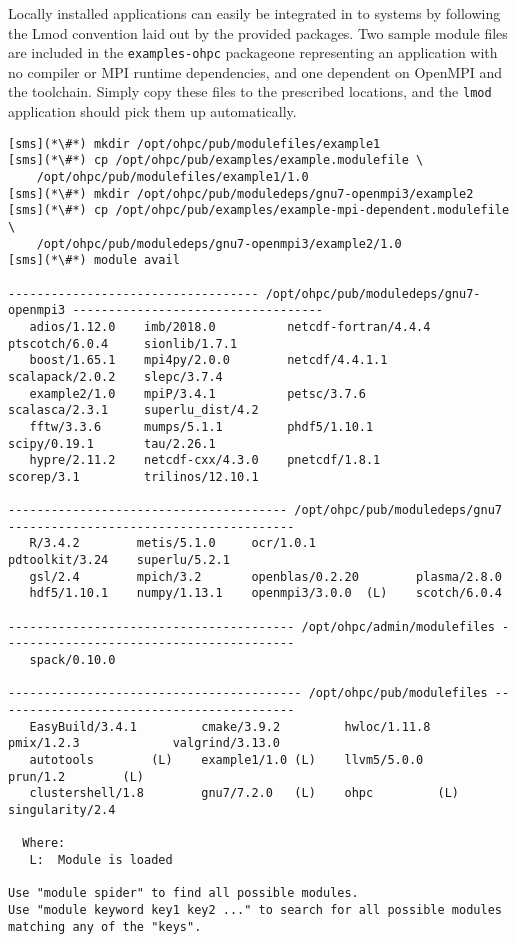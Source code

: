 Locally installed applications can easily be integrated in to \OHPC{} systems by
following the Lmod convention laid out by the provided packages. Two sample
module files are included in the \texttt{examples-ohpc} package\textemdash one
representing an application with no compiler or MPI runtime dependencies, and
one dependent on OpenMPI and the \GNU{} toolchain. Simply copy these files to the
prescribed locations, and the \texttt{lmod} application should pick them up
automatically.

\begin{lstlisting}[alsoletter={/,.},morekeywords={example1/1.0, example2/1.0}]
[sms](*\#*) mkdir /opt/ohpc/pub/modulefiles/example1
[sms](*\#*) cp /opt/ohpc/pub/examples/example.modulefile \
    /opt/ohpc/pub/modulefiles/example1/1.0
[sms](*\#*) mkdir /opt/ohpc/pub/moduledeps/gnu7-openmpi3/example2
[sms](*\#*) cp /opt/ohpc/pub/examples/example-mpi-dependent.modulefile \
    /opt/ohpc/pub/moduledeps/gnu7-openmpi3/example2/1.0
[sms](*\#*) module avail

----------------------------------- /opt/ohpc/pub/moduledeps/gnu7-openmpi3 -----------------------------------
   adios/1.12.0    imb/2018.0          netcdf-fortran/4.4.4    ptscotch/6.0.4     sionlib/1.7.1
   boost/1.65.1    mpi4py/2.0.0        netcdf/4.4.1.1          scalapack/2.0.2    slepc/3.7.4
   example2/1.0    mpiP/3.4.1          petsc/3.7.6             scalasca/2.3.1     superlu_dist/4.2
   fftw/3.3.6      mumps/5.1.1         phdf5/1.10.1            scipy/0.19.1       tau/2.26.1
   hypre/2.11.2    netcdf-cxx/4.3.0    pnetcdf/1.8.1           scorep/3.1         trilinos/12.10.1

--------------------------------------- /opt/ohpc/pub/moduledeps/gnu7 ----------------------------------------
   R/3.4.2        metis/5.1.0     ocr/1.0.1              pdtoolkit/3.24    superlu/5.2.1
   gsl/2.4        mpich/3.2       openblas/0.2.20        plasma/2.8.0
   hdf5/1.10.1    numpy/1.13.1    openmpi3/3.0.0  (L)    scotch/6.0.4

---------------------------------------- /opt/ohpc/admin/modulefiles -----------------------------------------
   spack/0.10.0

----------------------------------------- /opt/ohpc/pub/modulefiles ------------------------------------------
   EasyBuild/3.4.1         cmake/3.9.2         hwloc/1.11.8        pmix/1.2.3             valgrind/3.13.0
   autotools        (L)    example1/1.0 (L)    llvm5/5.0.0         prun/1.2        (L)
   clustershell/1.8        gnu7/7.2.0   (L)    ohpc         (L)    singularity/2.4

  Where:
   L:  Module is loaded

Use "module spider" to find all possible modules.
Use "module keyword key1 key2 ..." to search for all possible modules matching any of the "keys".
\end{lstlisting}
